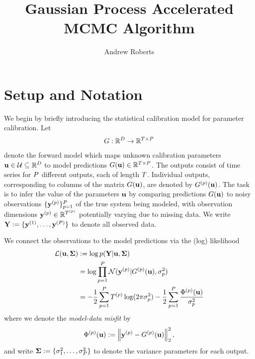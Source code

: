 \documentclass[12pt]{article}
\title{Gaussian Process Accelerated MCMC Algorithm}
\author{Andrew Roberts}
\begin{document}
\section{Setup and Notation}
We begin by briefly introducing the statistical calibration model for parameter calibration. Let 
\begin{align*}
\fwd: \R^{\Npar} \to \R^{\Ntime \times \Nobj}
\end{align*}
denote the forward model which maps unknown calibration parameters $\bpar \in \parSpace \subseteq \R^{\Npar}$ to model predictions 
$\fwd(\bpar) \in \R^{\Ntime \times \Nobj}$. The outputs consist of time series for $\Nobj$ different outputs, each of length $\Ntime$. 
Individual outputs, corresponding to columns of the matrix $\fwd(\bpar)$, are denoted by $\indexObj{\fwd}(\bpar)$. 
The task is to infer the value of the parameters $\bpar$ by comparing predictions $\fwd(\bpar)$ to noisy 
observations $\{\indexObj{\bstate}\}_{\objIdx=1}^{\Nobj}$ of the true system being modeled, with observation dimensions 
$\indexObj{\bstate} \in \R^{\indexObj{\Ntime}}$ potentially varying due to missing data. We write 
$\stateMat := \{\indexObj[1]{\bstate}, \dots, \indexObj[\Nobj]{\bstate} \}$ to denote all observed data. 

We connect the observations to the model predictions via the (log) likelihood 
\begin{align}
\llik(\bpar, \CovObs) 
&:= \log p(\stateMat|\bpar, \CovObs) \\
&= \log \prod_{\objIdx=1}^{\Nobj} \Gaussian(\indexObj{\bstate} | \indexObj{\fwd}(\bpar), \sdObs^2_{\objIdx}) \\
&= -\frac{1}{2} \sum_{\objIdx=1}^{\Nobj} \indexObj{\Ntime} \log(2\pi \sdObs^2_{\objIdx}) - \frac{1}{2} \sum_{\objIdx=1}^{\Nobj} \frac{\indexObj{\SSR}(\bpar)}{\sdObs^2_{\objIdx}}
\end{align}
where we denote the \textit{model-data misfit} by 
\begin{align}
\indexObj{\SSR}(\bpar) := \norm{\indexObj{\bstate} - \indexObj{\fwd}(\bpar)}_2^2,
\end{align}
 and write $\CovObs := \{\sdObs^2_1, \dots, \sdObs^2_{\Nobj}\}$ to denote the variance parameters for each output. 
\end{document}
